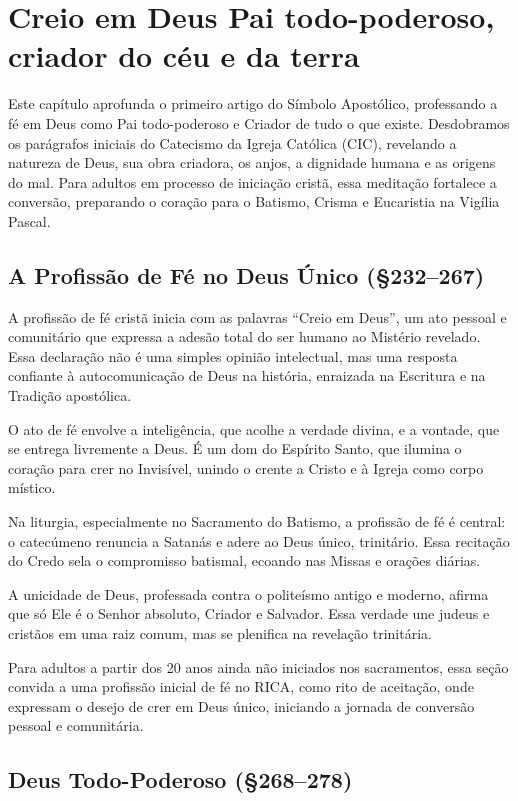\chapter{Creio em Deus Pai todo-poderoso, criador do céu e da terra}

Este capítulo aprofunda o primeiro artigo do Símbolo Apostólico, professando a fé em Deus como Pai todo-poderoso e Criador de tudo o que existe. Desdobramos os parágrafos iniciais do Catecismo da Igreja Católica (CIC), revelando a natureza de Deus, sua obra criadora, os anjos, a dignidade humana e as origens do mal. Para adultos em processo de iniciação cristã, essa meditação fortalece a conversão, preparando o coração para o Batismo, Crisma e Eucaristia na Vigília Pascal.

\section{A Profissão de Fé no Deus Único (\S 232--267)}

A profissão de fé cristã inicia com as palavras ``Creio em Deus'', um ato pessoal e comunitário que expressa a adesão total do ser humano ao Mistério revelado. Essa declaração não é uma simples opinião intelectual, mas uma resposta confiante à autocomunicação de Deus na história, enraizada na Escritura e na Tradição apostólica.

O ato de fé envolve a inteligência, que acolhe a verdade divina, e a vontade, que se entrega livremente a Deus. É um dom do Espírito Santo, que ilumina o coração para crer no Invisível, unindo o crente a Cristo e à Igreja como corpo místico.

Na liturgia, especialmente no Sacramento do Batismo, a profissão de fé é central: o catecúmeno renuncia a Satanás e adere ao Deus único, trinitário. Essa recitação do Credo sela o compromisso batismal, ecoando nas Missas e orações diárias.

A unicidade de Deus, professada contra o politeísmo antigo e moderno, afirma que só Ele é o Senhor absoluto, Criador e Salvador. Essa verdade une judeus e cristãos em uma raiz comum, mas se plenifica na revelação trinitária.

Para adultos a partir dos 20 anos ainda não iniciados nos sacramentos, essa seção convida a uma profissão inicial de fé no RICA, como rito de aceitação, onde expressam o desejo de crer em Deus único, iniciando a jornada de conversão pessoal e comunitária.

\section{Deus Todo-Poderoso (\S 268--278)}


